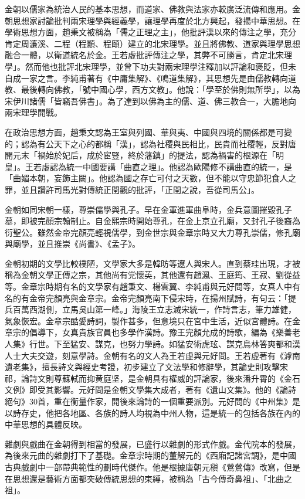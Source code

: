 金朝以儒家為統治人民的基本思想，而道家、佛教與法家亦較廣泛流傳和應用。金朝思想家討論批判兩宋理學與經義學，讓理學再度於北方興起，發揚中華思想。在學術思想方面，趙秉文被稱為「儒之正理之主」，他批評漢以來的傳注之學，充分肯定周濂溪、二程（程顥、程頤）建立的北宋理學。並且將佛教、道家與理學思想融合一體，以衛道統名於金。王若虛批評傳注之學，其弊不可勝言，肯定北宋理學」。然而他也批評北宋理學，並曾下功夫對兩宋理學注釋加以評論和褒貶，但未自成一家之言。李純甫著有《中庸集解》、《鳴道集解》，其思想先是由儒教轉向道教、最後轉向佛教，「號中國心學，西方文教」。他說：「學至於佛則無所學」，以為宋伊川諸儒「皆竊吾佛書」。為了達到以佛為主的儒、道、佛三教合一，大膽地向兩宋理學開戰。

在政治思想方面，趙秉文認為王室與列國、華與夷、中國與四境的關係都是可變的；認為有公天下之心的都稱「漢」，認為社稷與民相比，民貴而社稷輕，反對唐開元末「禍始於妃后，成於宦豎，終於藩鎮」的提法，認為禍害的根源在「明皇」。王若虛認為統一中國要講「曲直之理」。他認為歐陽修不講曲直的統一，是「曲媚本朝，妄飾主闕」。他認為國之存亡可付之天數，但不能以守忠節犯食人之罪，並且讚許司馬光對傳統正閏觀的批評，「正閏之說，吾從司馬公」。

金朝如同宋朝一樣，尊崇儒學與孔子。早在金軍進軍曲阜時，金兵意圖摧毀孔子墓，即被完顏宗翰制止。自金熙宗時開始尊孔，在金上京立孔廟，又封孔子後裔為衍聖公。雖然金帝完顏亮輕視儒學，到金世宗與金章宗時又大力尊孔崇儒，修孔廟與廟學，並且推崇《尚書》、《孟子》。

金朝初期的文學比較樸陋，文學家大多是韓昉等遼人與宋人。直到蔡珪出現，才被稱為金朝文學正傳之宗，其他尚有党懷英，其他還有趙渢、王庭筠、王寂、劉從益等。金章宗時期有名的文學家有趙秉文、楊雲翼、李純甫與元好問等，女真人中有名的有金帝完顏亮與金章宗。金帝完顏亮南下侵宋時，在揚州賦詩，有句云：「提兵百萬西湖側，立馬吳山第一峰。」海陵王立志滅宋統一，作詩言志，筆力雄健，氣象恢宏。金章宗酷愛詩詞，製作甚多，但意境只在宮中生活，近似宮體詩。在金章宗的倡導下，女真貴族官員也多學作漢詩。豫王完顏允成的詩歌，編為《樂善老人集》行世。下至猛安、謀克，也努力學詩。如猛安術虎玹、謀克烏林答爽都和漢人士大夫交遊，刻意學詩。金朝有名的文人為王若虛與元好問。王若虛著有《滹南遺老集》，擅長詩文與經史考證，初步建立了文法學和修辭學，其論史則攻擊宋祁，論詩文則尊蘇軾而抑黄庭坚，是金朝具有權威的評論家，後來潘升霄的《金石文例》即受其影響。元好問是金朝文學集大成者，著有《遺山文集》。他的《論詩絕句》30首，重在衡量作家，開後來論詩的一個重要派別。元好問的《中州集》是以詩存史，他把各地區、各族的詩人均視為中州人物，這是統一的包括各族在內的中華思想的具體反映。

雜劇與戲曲在金朝得到相當的發展，已盛行以雜劇的形式作戲。金代院本的發展，為後來元曲的雜劇打下了基礎。金章宗時期的董解元的《西廂記諸宮調》，是中國古典戲劇中一部帶典範性的劃時代傑作。他是根據唐朝元稹《鶯鶯傳》改寫，但是在思想還是藝術方面都突破傳統思想的束縛，被稱為「古今傳奇鼻祖」、「北曲之祖」。

